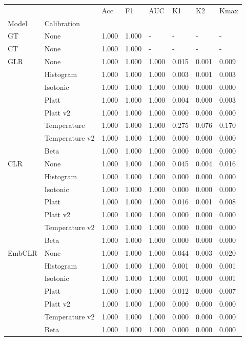\begin{tabular}{llllllll}
\toprule
 &  & Acc & F1 & AUC & K1 & K2 & Kmax \\
Model & Calibration &  &  &  &  &  &  \\
\midrule
GT & None & 1.000 & 1.000 & - & - & - & - \\
\cline{1-8}
CT & None & 1.000 & 1.000 & - & - & - & - \\
\cline{1-8}
\multirow[t]{8}{*}{GLR} & None & 1.000 & 1.000 & 1.000 & 0.015 & 0.001 & 0.009 \\
 & Histogram & 1.000 & 1.000 & 1.000 & 0.003 & 0.001 & 0.003 \\
 & Isotonic & 1.000 & 1.000 & 1.000 & 0.000 & 0.000 & 0.000 \\
 & Platt & 1.000 & 1.000 & 1.000 & 0.004 & 0.000 & 0.003 \\
 & Platt v2 & 1.000 & 1.000 & 1.000 & 0.000 & 0.000 & 0.000 \\
 & Temperature & 1.000 & 1.000 & 1.000 & 0.275 & 0.076 & 0.170 \\
 & Temperature v2 & 1.000 & 1.000 & 1.000 & 0.000 & 0.000 & 0.000 \\
 & Beta & 1.000 & 1.000 & 1.000 & 0.000 & 0.000 & 0.000 \\
\cline{1-8}
\multirow[t]{7}{*}{CLR} & None & 1.000 & 1.000 & 1.000 & 0.045 & 0.004 & 0.016 \\
 & Histogram & 1.000 & 1.000 & 1.000 & 0.000 & 0.000 & 0.000 \\
 & Isotonic & 1.000 & 1.000 & 1.000 & 0.000 & 0.000 & 0.000 \\
 & Platt & 1.000 & 1.000 & 1.000 & 0.016 & 0.001 & 0.008 \\
 & Platt v2 & 1.000 & 1.000 & 1.000 & 0.000 & 0.000 & 0.000 \\
 & Temperature v2 & 1.000 & 1.000 & 1.000 & 0.000 & 0.000 & 0.000 \\
 & Beta & 1.000 & 1.000 & 1.000 & 0.000 & 0.000 & 0.000 \\
\cline{1-8}
\multirow[t]{7}{*}{EmbCLR} & None & 1.000 & 1.000 & 1.000 & 0.044 & 0.003 & 0.020 \\
 & Histogram & 1.000 & 1.000 & 1.000 & 0.001 & 0.000 & 0.001 \\
 & Isotonic & 1.000 & 1.000 & 1.000 & 0.001 & 0.000 & 0.001 \\
 & Platt & 1.000 & 1.000 & 1.000 & 0.012 & 0.000 & 0.007 \\
 & Platt v2 & 1.000 & 1.000 & 1.000 & 0.000 & 0.000 & 0.000 \\
 & Temperature v2 & 1.000 & 1.000 & 1.000 & 0.000 & 0.000 & 0.000 \\
 & Beta & 1.000 & 1.000 & 1.000 & 0.000 & 0.000 & 0.000 \\
\cline{1-8}
\bottomrule
\end{tabular}
